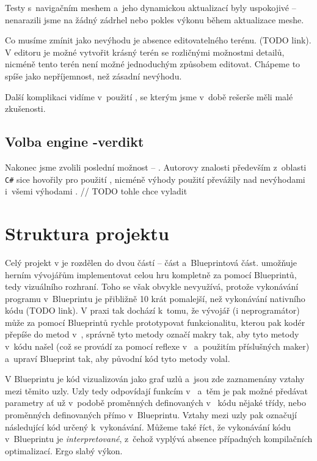 Testy s~navigačním meshem a~jeho dynamickou aktualizací byly uspokojivé -- nenarazili jsme na žádný zádrhel nebo pokles výkonu během aktualizace meshe. 

Co musíme zmínit jako nevýhodu je absence editovatelného terénu. (TODO link). V editoru je možné vytvořit krásný terén se rozličnými možnostmi detailů, nicméně tento terén není možné jednoduchým způsobem editovat. Chápeme to spíše jako nepříjemnost, než zásadní nevýhodu. 

Další komplikaci vidíme v~použití \CPP{}, se kterým jsme v~době rešerše měli malé zkušenosti.




\subsection{Volba engine -verdikt}


Nakonec jsme zvolili poslední možnost -- \UE{}. Autorovy znalosti především z~oblasti \texttt{C\#} sice hovořily pro použití \UN{}, nicméně výhody použití \UE{} převážily nad nevýhodami i~všemi výhodami \UN{}.	// TODO tohle chce vyladit


\section{Struktura projektu}

Celý projekt v \UE{} je rozdělen do dvou částí -- \CPP{} část a~Blueprintová část. \UE{} umožňuje herním vývojářům implementovat celou hru kompletně za pomocí Blueprintů, tedy vizuálního rozhraní. Toho se však obvykle nevyužívá, protože vykonávání programu v~Blueprintu je přibližně 10 krát pomalejší, než vykonávání nativního \CPP{} kódu (TODO link). V praxi tak dochází k~tomu, že vývojář (i neprogramátor) může za pomocí Blueprintů rychle prototypovat funkcionalitu, kterou pak kodér přepíše do metod v~\CPP{}, správně tyto metody označí makry tak, aby \UE{} tyto metody v~kódu našel (což se provádí za pomocí reflexe v~\UBT{} a~použitím příslušných \CPP{} maker) a~upraví Blueprint tak, aby původní kód tyto metody volal.

 V Blueprintu je kód vizualizován jako graf uzlů a~jsou zde zaznamenány vztahy mezi těmito uzly. Uzly tedy odpovídají funkcím v~\CPP{} a~těm je pak možné předávat parametry ať už v~podobě proměnných definovaných v~\CPP{} kódu nějaké třídy, nebo proměnných definovaných přímo v~Blueprintu. Vztahy mezi uzly pak označují následující kód určený k~vykonávání. Můžeme také říct, že vykonávání kódu v~Blueprintu je \textit{interpretované}, z~čehož vyplývá absence případných kompilačních optimalizací. Ergo slabý výkon. 

